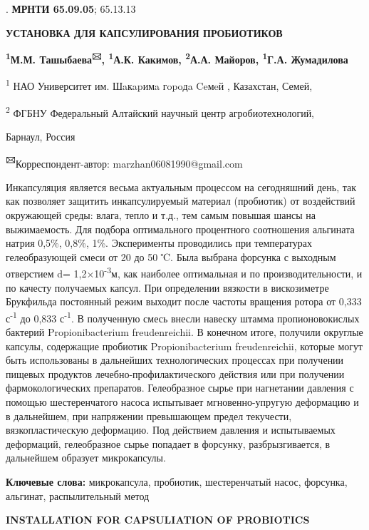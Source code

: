 

.\newpage
{\bfseries МРНТИ 65.09.05}; 65.13.13

{\bfseries УСТАНОВКА ДЛЯ КАПСУЛИРОВАНИЯ ПРОБИОТИКОВ}

{\bfseries \textsuperscript{1}М.М. Ташыбаева\textsuperscript{🖂},
\textsuperscript{1}А.К. Какимов, \textsuperscript{2}А.А. Майоров,
\textsuperscript{1}Г.А. Жумадилова}

\textsuperscript{1} НАО Университет им. Шaкapимa гopoдa Ceмeй ,
Казахстан, Семей,

\textsuperscript{2} ФГБНУ Федеральный Алтайский научный центр
агробиотехнологий,

Барнаул, Россия

{\bfseries \textsuperscript{🖂}}Корреспондент-автор:
marzhan06081990@gmail.com

Инкапсуляция является весьма актуальным процессом на сегодняшний день,
так как позволяет защитить инкапсулируемый материал (пробиотик) от
воздействий окружающей среды: влага, тепло и т.д., тем самым повышая
шансы на выжимаемость. Для подбора оптимального процентного соотношения
альгината натрия 0,5\%, 0,8\%, 1\%. Эксперименты проводились при
температурах гелеобразующей смеси от 20 до 50 ℃. Была выбрана форсунка с
выходным отверстием d= 1,2×10\textsuperscript{-3}м, как наиболее
оптимальная и по производительности, и по качесту получаемых капсул. При
определении вязкости в вискозиметре Брукфильда постоянный режим выходит
после частоты вращения ротора от 0,333 с\textsuperscript{-1} до 0,833
с\textsuperscript{-1}. В полученную смесь внесли навеску штамма
пропионовокислых бактерий Propionibacterium freudenreichii. В конечном
итоге, получили округлые капсулы, содержащие пробиотик Propionibacterium
freudenreichii, которые могут быть использованы в дальнейших
технологических процессах при получении пищевых продуктов
лечебно-профилактического действия или при получении фармокологических
препаратов. Гелеобразное сырье при нагнетании давления с помощью
шестеренчатого насоса испытывает мгновенно-упругую деформацию и в
дальнейшем, при напряжении превышающем предел текучести,
вязкопластическую деформацию. Под действием давления и испытываемых
деформаций, гелеобразное сырье попадает в форсунку, разбрызгивается, в
дальнейшем образует микрокапсулы.

{\bfseries Ключевые слова:} микрокапсула, пробиотик, шестеренчатый насос,
форсунка, альгинат, распылительный метод

{\bfseries INSTALLATION FOR CAPSULIATION OF PROBIOTICS}

